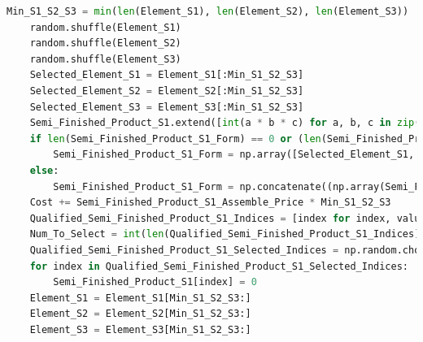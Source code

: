 \documentclass[withoutpreface,bwprint]{cumcmthesis} %
\begin{document}
\begin{appendices}
\begin{lstlisting}[language=python]
    Min_S1_S2_S3 = min(len(Element_S1), len(Element_S2), len(Element_S3))
    random.shuffle(Element_S1)
    random.shuffle(Element_S2)
    random.shuffle(Element_S3)
    Selected_Element_S1 = Element_S1[:Min_S1_S2_S3]
    Selected_Element_S2 = Element_S2[:Min_S1_S2_S3]
    Selected_Element_S3 = Element_S3[:Min_S1_S2_S3]
    Semi_Finished_Product_S1.extend([int(a * b * c) for a, b, c in zip(Selected_Element_S1, Selected_Element_S2, Selected_Element_S3)])
    if len(Semi_Finished_Product_S1_Form) == 0 or (len(Semi_Finished_Product_S1_Form) == 3 and all(len(sublist) == 0 for sublist in Semi_Finished_Product_S1_Form)):
        Semi_Finished_Product_S1_Form = np.array([Selected_Element_S1, Selected_Element_S2, Selected_Element_S3])
    else:
        Semi_Finished_Product_S1_Form = np.concatenate((np.array(Semi_Finished_Product_S1_Form), np.array([Selected_Element_S1, Selected_Element_S2, Selected_Element_S3])), axis=1)
    Cost += Semi_Finished_Product_S1_Assemble_Price * Min_S1_S2_S3
    Qualified_Semi_Finished_Product_S1_Indices = [index for index, value in enumerate(Semi_Finished_Product_S1) if value == 1]
    Num_To_Select = int(len(Qualified_Semi_Finished_Product_S1_Indices) * Semi_Finished_Product_S1_Defect_Rate)
    Qualified_Semi_Finished_Product_S1_Selected_Indices = np.random.choice(Qualified_Semi_Finished_Product_S1_Indices, size=Num_To_Select, replace=False)
    for index in Qualified_Semi_Finished_Product_S1_Selected_Indices:
        Semi_Finished_Product_S1[index] = 0
    Element_S1 = Element_S1[Min_S1_S2_S3:]
    Element_S2 = Element_S2[Min_S1_S2_S3:]
    Element_S3 = Element_S3[Min_S1_S2_S3:]


\end{lstlisting}
\end{appendices}
\end{document}
